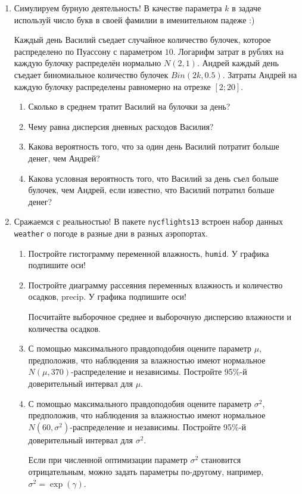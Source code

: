 \begin{enumerate}
\item Симулируем бурную деятельность!
В качестве параметра $k$ в задаче используй число букв в своей фамилии в именительном падеже :)

Каждый день Василий съедает случайное количество булочек, которое распределено по Пуассону с параметром $10$. Логарифм затрат в рублях на каждую булочку распределён нормально $N(2, 1)$.
Андрей каждый день съедает биномиальное количество булочек $Bin(2k, 0.5)$. Затраты Андрей на каждую булочку распределены равномерно на отрезке $[2;20]$.

\begin{enumerate}
\item Сколько в среднем тратит Василий на булочки за день?
\item Чему равна дисперсия дневных расходов Василия?
\item Какова вероятность того, что за один день Василий потратит больше денег,
чем Андрей?
\item Какова условная вероятность того,
что Василий за день съел больше булочек, чем Андрей,
если известно, что Василий потратил больше денег?
\end{enumerate}


\item Сражаемся с реальностью!
В пакете \verb|nycflights13| встроен набор данных \verb|weather| о погоде в разные дни в разных аэропортах.
\begin{enumerate}
	\item Постройте гистограмму переменной влажность, \verb|humid|.
	У графика подпишите оси!

\item Постройте диаграмму рассеяния переменных влажность и количество осадков,
precip. У графика подпишите оси!

Посчитайте выборочное среднее и выборочную дисперсию влажности и количества осадков.

\item С помощью максимального правдоподобия оцените параметр $\mu$,
предположив, что наблюдения за влажностью имеют нормальное $N\left(\mu, 370\right)$-распределение и независимы.
Постройте 95\%-й доверительный интервал для $\mu$.

\item С помощью максимального правдоподобия оцените параметр $\sigma^2$,
предположив, что наблюдения за влажностью имеют нормальное $N\left(60, \sigma^2\right)$-распределение и независимы.
Постройте 95\%-й доверительный интервал для $\sigma^2$.

Если при численной оптимизации параметр $\sigma^2$ становится отрицательным,
можно задать параметры по-другому, например, $\sigma^2 = \exp(\gamma)$.
\end{enumerate}
\end{enumerate}
